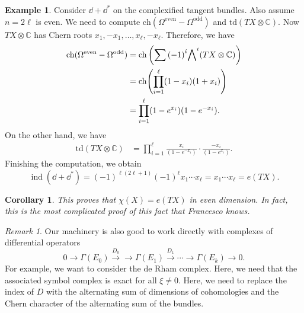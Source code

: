 \documentclass[leqno, openany]{memoir}
\newtheorem{cor}[thm]{Corollary}
\theoremstyle{definition}
\newtheorem{exm}[thm]{Example}
\theoremstyle{remark}
\newtheorem{rmk}[thm]{Remark}
\theoremstyle{plain}
\theoremstyle{definition}
\theoremstyle{remark}
\newcommand{\C}{\mathbb{C}}
\newcommand{\mr}[1]{\mathrm{#1}}
\DeclareMathOperator{\ch}{ch}
\DeclareMathOperator{\ind}{ind}
\begin{document}
\begin{exm} Consider $\dd + \dd^*$ on the complexified tangent bundles. Also
    assume $n = 2 \ell$ is even. We need to compute $\mr{ch}(\Omega^{\mr{even}}
    - \Omega^{\mr{odd}})$ and $\mr{td}(TX \otimes \C)$. Now $TX \otimes \C$ has
    Chern roots $x_1, -x_1, \ldots, x_{\ell}, -x_{\ell}$. Therefore, we have
    \begin{align*} \mr{ch}(\Omega^{\mr{even}} - \Omega^{\mr{odd}}) &=
        \ch\qty(\sum {(-1)}^i {\bigwedge}^i (TX \otimes \C)) \\ &=
        \mr{ch}\qty(\prod_{i=1}^{\ell} (1-x_i) (1+x_i)) \\ &=
        \prod_{i=1}^{\ell} (1-e^{x_i})(1-e^{-x_i}).  \end{align*} On the other
        hand, we have \begin{align*} \mr{td}(TX \otimes \C) &=
            \prod_{i=1}^{\ell} \frac{x_i}{(1-e^{-x_i})} \cdot
            \frac{-x_i}{(1-e^{x_i})}.  \end{align*} Finishing the computation,
            we obtain \[ \ind(\dd + \dd^*) = {(-1)}^{\ell(2\ell+1)}
            {(-1)}^{\ell} x_1 \cdots x_{\ell} = x_1 \cdots x_{\ell} = e(TX). \]
        \end{exm}

\begin{cor} This proves that $\chi(X) = e(TX)$ in even dimension. In fact, this
is the most complicated proof of this fact that Francesco knows.  \end{cor}

\begin{rmk} Our machinery is also good to work directly with complexes of
    differential operators \[ 0 \to \Gamma(E_0) \xrightarrow{D_0} \to
    \Gamma(E_1) \xrightarrow{D_1} \cdots \to \Gamma(E_k) \to 0. \] For example,
    we want to consider the de Rham complex. Here, we need that the associated
    symbol complex is exact for all $\xi \neq 0$. Here, we need to replace the
    index of $D$ with the alternating sum of dimensions of cohomologies and the
    Chern character of the alternating sum of the bundles.  \end{rmk}
\end{document}
